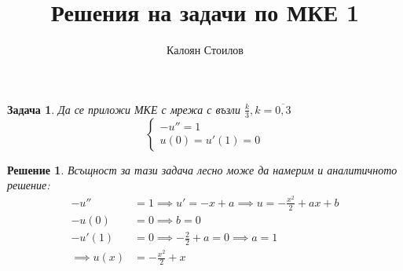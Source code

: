 \documentclass[12pt]{article}
\title{Решения на задачи по МКЕ 1}
\author{Калоян Стоилов}
\newtheorem{problem}{Задача}
\newtheorem*{solution*}{Решение}
\begin{document}
\maketitle
\begin{large}
\begin{problem}
Да се приложи МКЕ с мрежа с възли $\frac{k}{3}, k=\overline{0,3}$ 
\begin{equation}
    \begin{cases}
      -u'' = 1 \\
      u\left(0\right)=u'\left(1\right)=0
    \end{cases}
\end{equation}
\end{problem}

\begin{solution*}
Всъщност за тази задача лесно може да намерим и аналитичното решение:
\begin{align*}
-u'' &= 1 \implies u' = -x + a \implies u = -\frac{x^2}{2} + ax + b \\
-u\left(0\right) &= 0 \implies b = 0 \\
-u'\left(1\right) &= 0 \implies -\frac{2}{2} + a = 0 \implies a=1 \\
\implies u(x) &= -\frac{x^2}{2}+x
\end{align*}


\end{solution*}
\end{large}
\end{document}
